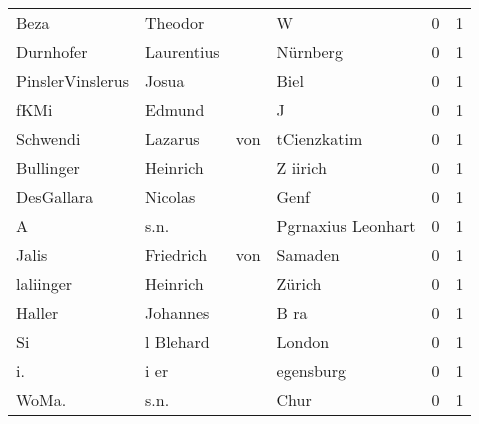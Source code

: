 \begin{tabular}{llllrr}
                     Beza &                            Theodor &             &                                           W &          0 &         1 \\
                Durnhofer &                         Laurentius &             &                                    Nürnberg &          0 &         1 \\
         PinslerVinslerus &                              Josua &             &                                        Biel &          0 &         1 \\
                     fKMi &                             Edmund &             &                                           J &          0 &         1 \\
                 Schwendi &                            Lazarus &         von &                                 tCienzkatim &          0 &         1 \\
                Bullinger &                           Heinrich &             &                                    Z iirich &          0 &         1 \\
               DesGallara &                            Nicolas &             &                                        Genf &          0 &         1 \\
                        A &                               s.n. &             &                          Pgrnaxius Leonhart &          0 &         1 \\
                    Jalis &                          Friedrich &         von &                                     Samaden &          0 &         1 \\
                laliinger &                           Heinrich &             &                                      Zürich &          0 &         1 \\
                   Haller &                           Johannes &             &                                        B ra &          0 &         1 \\
                       Si &                          l Blehard &             &                                      London &          0 &         1 \\
                       i. &                               i er &             &                                   egensburg &          0 &         1 \\
                    WoMa. &                               s.n. &             &                                        Chur &          0 &         1 \\

\end{tabular}
